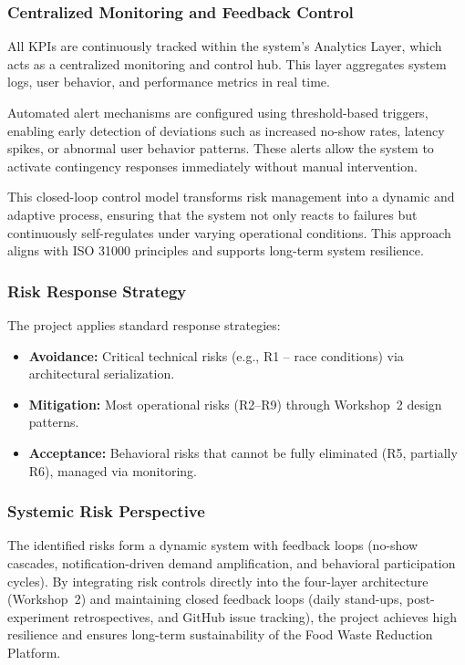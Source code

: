 \documentclass[9pt,conference]{IEEEtran}
\begin{document}
\subsubsection{Centralized Monitoring and Feedback Control}

All KPIs are continuously tracked within the system's Analytics Layer, which acts as a centralized monitoring and control hub. This layer aggregates system logs, user behavior, and performance metrics in real time.

Automated alert mechanisms are configured using threshold-based triggers, enabling early detection of deviations such as increased no-show rates, latency spikes, or abnormal user behavior patterns. These alerts allow the system to activate contingency responses immediately without manual intervention.

This closed-loop control model transforms risk management into a dynamic and adaptive process, ensuring that the system not only reacts to failures but continuously self-regulates under varying operational conditions. This approach aligns with ISO 31000 principles and supports long-term system resilience.

\subsubsection{Risk Response Strategy}

The project applies standard response strategies:
\begin{itemize}
    \item \textbf{Avoidance:} Critical technical risks (e.g., R1 – race conditions) via architectural serialization.
    \item \textbf{Mitigation:} Most operational risks (R2–R9) through Workshop~2 design patterns.
    \item \textbf{Acceptance:} Behavioral risks that cannot be fully eliminated (R5, partially R6), managed via monitoring.
\end{itemize}

\subsubsection{Systemic Risk Perspective}

The identified risks form a dynamic system with feedback loops (no-show cascades, notification-driven demand amplification, and behavioral participation cycles). By integrating risk controls directly into the four-layer architecture (Workshop~2) and maintaining closed feedback loops (daily stand-ups, post-experiment retrospectives, and GitHub issue tracking), the project achieves high resilience and ensures long-term sustainability of the Food Waste Reduction Platform.
\end{document}
